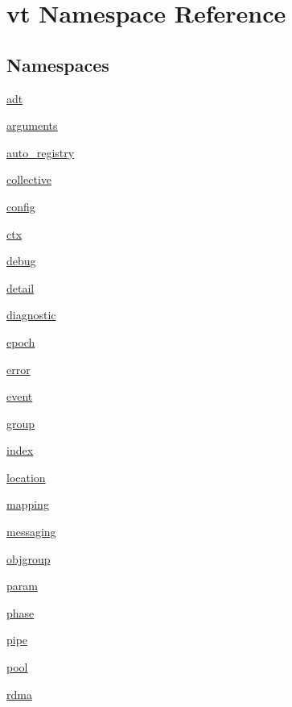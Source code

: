 \hypertarget{namespacevt}{}\section{vt Namespace Reference}
\label{namespacevt}
\subsection*{Namespaces}
\begin{DoxyCompactItemize}
\item 
 \hyperlink{namespacevt_1_1adt}{adt}
\item 
 \hyperlink{namespacevt_1_1arguments}{arguments}
\item 
 \hyperlink{namespacevt_1_1auto__registry}{auto\+\_\+registry}
\item 
 \hyperlink{namespacevt_1_1collective}{collective}
\item 
 \hyperlink{namespacevt_1_1config}{config}
\item 
 \hyperlink{namespacevt_1_1ctx}{ctx}
\item 
 \hyperlink{namespacevt_1_1debug}{debug}
\item 
 \hyperlink{namespacevt_1_1detail}{detail}
\item 
 \hyperlink{namespacevt_1_1diagnostic}{diagnostic}
\item 
 \hyperlink{namespacevt_1_1epoch}{epoch}
\item 
 \hyperlink{namespacevt_1_1error}{error}
\item 
 \hyperlink{namespacevt_1_1event}{event}
\item 
 \hyperlink{namespacevt_1_1group}{group}
\item 
 \hyperlink{namespacevt_1_1index}{index}
\item 
 \hyperlink{namespacevt_1_1location}{location}
\item 
 \hyperlink{namespacevt_1_1mapping}{mapping}
\item 
 \hyperlink{namespacevt_1_1messaging}{messaging}
\item 
 \hyperlink{namespacevt_1_1objgroup}{objgroup}
\item 
 \hyperlink{namespacevt_1_1param}{param}
\item 
 \hyperlink{namespacevt_1_1phase}{phase}
\item 
 \hyperlink{namespacevt_1_1pipe}{pipe}
\item 
 \hyperlink{namespacevt_1_1pool}{pool}
\item 
 \hyperlink{namespacevt_1_1rdma}{rdma}
\item 

\end{DoxyCompactItemize}
